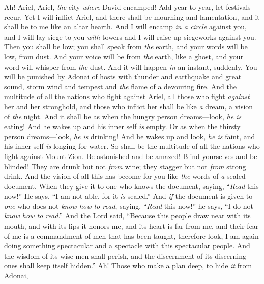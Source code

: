\begin{biblechapter} %
 Ah! Ariel, Ariel, \textit{the} city \textit{where} David encamped!
\verse Add year to year, 
let festivals recur.
\verse Yet I will inflict Ariel, 
and there shall be mourning and lamentation, 
and it shall be to me like an altar hearth.
\verse And I will encamp \textit{in a circle} against you, 
and I will lay siege to you \textit{with} towers 
and I will raise up siegeworks against you.
\verse Then you shall be low; 
you shall speak from \textit{the} earth, 
and your words will be low, from dust. 
And your voice will be from \textit{the} earth, like a ghost, 
and your word will whisper from \textit{the} dust. And it will happen \textit{in} an instant, suddenly.
\verse You will be punished by Adonai of hosts
\verse with thunder and earthquake and great sound, 
storm wind and tempest and \textit{the} flame of a devouring fire.
\verse And the multitude of all the nations who fight against Ariel, 
all those who fight \textit{against} her and her stronghold, 
and those who inflict her shall be like \textit{a} dream, a vision of \textit{the} night.
\verse And it shall be as when the hungry person dreams—look, \textit{he is} eating! 
And he wakes up and his inner self \textit{is} empty. 
Or as when the thirsty person dreams—look, \textit{he is} drinking! 
And he wakes up and look, \textit{he is} faint, 
and his inner self \textit{is} longing for water. 
So shall be the multitude of all the nations who fight against Mount Zion.
\verse Be astonished and be amazed! 
Blind yourselves and be blinded! 
They are drunk but not \textit{from} wine; 
they stagger but not \textit{from} strong drink.
\verse And the vision of all this has become for you like \textit{the} words of \textit{a} sealed document. When they give it to one who knows the document, saying, “\textit{Read} this now!” He says, “I am not able, for it \textit{is} sealed.”
\verse And \textit{if} the document is given to \textit{one} who does not \textit{know how to read}, saying, “\textit{Read} this now!” he says, “I do not \textit{know how to read}.”
\verse And the Lord said, “Because this people draw near with its mouth, 
and with its lips it honors me, 
and its heart is far from me, 
and their fear of me is a commandment of men that has been taught,
\verse therefore look, I am again doing something spectacular
\verse and a spectacle with this spectacular people. 
And the wisdom of its wise men shall perish, 
and the discernment of its discerning ones shall keep itself hidden.”
\verse Ah! Those who make a plan deep, to hide \textit{it} from Adonai, 

\end{biblechapter}

